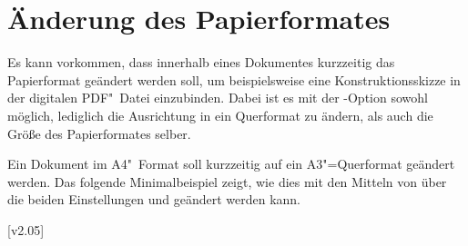 \section{Änderung des Papierformates}
%
%
Es kann vorkommen, dass innerhalb eines Dokumentes kurzzeitig das Papierformat 
geändert werden soll, um beispielsweise eine Konstruktionsskizze in der 
digitalen PDF"~Datei einzubinden. Dabei ist es mit der \KOMAScript-Option 
 sowohl möglich, lediglich die Ausrichtung in ein
Querformat zu ändern, als auch die Größe des Papierformates selber.
%
\begin{Example}
Ein Dokument im A4"~Format soll kurzzeitig auf ein A3"=Querformat geändert 
werden. Das folgende Minimalbeispiel zeigt, wie dies mit den Mitteln von 
\KOMAScript{} über die beiden Einstellungen  und 
 geändert werden kann.
\end{Example}

[v2.05]


